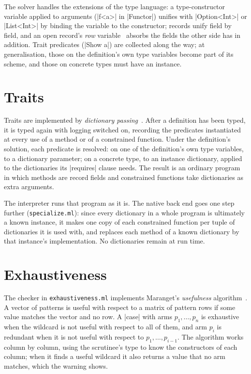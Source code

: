 The solver handles the extensions of the type language: a type-constructor
variable applied to arguments (\fc|f<a>| in \fc|Functor|) unifies with
\fc|Option<Int>| or \fc|List<Int>| by binding the variable to the
constructor; records unify field by field, and an open record's \emph{row}
variable~\cite{remy} absorbs the fields the other side has in addition. Trait predicates
(\fc|Show a|) are collected along the way; at generalisation, those on the
definition's own type variables become part of its scheme, and those on
concrete types must have an instance.

\section{Traits}
\label{sec:impl-traits}

Traits are implemented by \emph{dictionary passing}~\cite{wadler-blott}.
After a definition has been typed, it is typed again with logging switched
on, recording the predicates instantiated at every use of a method or of a
constrained function. Under the definition's solution, each predicate is
resolved: on one of the definition's own type variables, to a dictionary
parameter; on a concrete type, to an instance dictionary, applied to the
dictionaries its \fc|requires| clause needs. The result is an ordinary
program in which methods are record fields and constrained functions take
dictionaries as extra arguments.

The interpreter runs that program as it is. The native back end goes one
step further (\texttt{specialize.ml}): since every dictionary in a whole
program is ultimately a known instance, it makes one copy of each
constrained function per tuple of dictionaries it is used with, and replaces
each method of a known dictionary by that instance's implementation. No
dictionaries remain at run time.

\section{Exhaustiveness}
\label{sec:impl-exhaustiveness}

The checker in \texttt{exhaustiveness.ml} implements Maranget's
\emph{usefulness} algorithm~\cite{maranget}. A vector of patterns is useful
with respect to a matrix of pattern rows if some value matches the vector
and no row. A \fc|case| with arms $p_1, \dots, p_n$ is exhaustive when the
wildcard is not useful with respect to all of them, and arm $p_i$ is
redundant when it is not useful with respect to $p_1, \dots, p_{i-1}$. The
algorithm works column by column, using the scrutinee's type to know the
constructors of each column; when it finds a useful wildcard it also
returns a value that no arm matches, which the warning shows.

